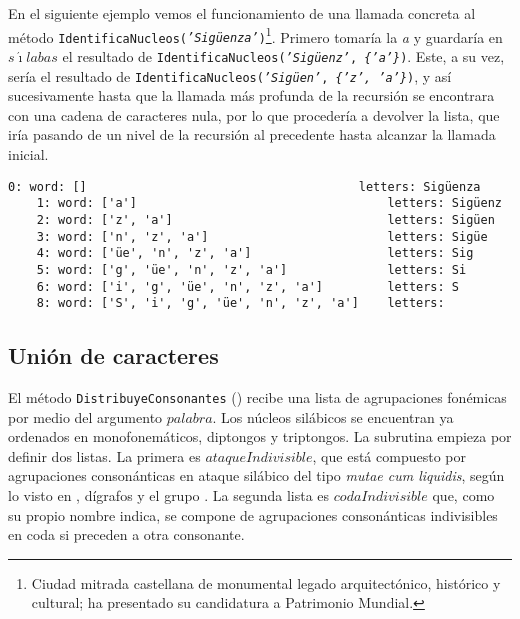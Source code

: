 En el siguiente ejemplo vemos el funcionamiento de una llamada concreta al método \texttt{IdentificaNucleos(\textit{'Sigüenza'})}\footnote{Ciudad mitrada castellana de monumental legado arquitectónico, histórico y cultural; ha presentado su candidatura a Patrimonio Mundial.}. Primero tomaría la \textit{a} y guardaría en  $s\acute{\imath}labas$ el resultado de \texttt{IdentificaNucleos(\textit{'Sigüenz'}, \textit{\{'a'\}})}. Este, a su vez, sería el resultado de \texttt{IdentificaNucleos(\textit{'Sigüen'}, \textit{\{'z', 'a'\}})}, y así sucesivamente hasta que la llamada más profunda de la recursión se encontrara con una cadena de caracteres nula, por lo que procedería a devolver la lista, que iría pasando de un nivel de la recursión al precedente hasta alcanzar la llamada inicial.
 
\begin{Verbatim}[fontsize=\footnotesize,xleftmargin=5ex]
	0: word: []                                      letters: Sigüenza
	1: word: ['a']                                   letters: Sigüenz
	2: word: ['z', 'a']                              letters: Sigüen
	3: word: ['n', 'z', 'a']                         letters: Sigüe
	4: word: ['üe', 'n', 'z', 'a']                   letters: Sig
	5: word: ['g', 'üe', 'n', 'z', 'a']              letters: Si
	6: word: ['i', 'g', 'üe', 'n', 'z', 'a']         letters: S
	8: word: ['S', 'i', 'g', 'üe', 'n', 'z', 'a']    letters:
\end{Verbatim}

\subsection{Unión de caracteres}
El método \texttt{DistribuyeConsonantes}  () recibe una lista de agrupaciones fonémicas por medio del argumento  $palabra$. Los núcleos silábicos se encuentran ya ordenados en monofonemáticos, diptongos y triptongos. La subrutina empieza por definir dos listas. La primera es $ataqueIndivisible$, que está compuesto por agrupaciones consonánticas en ataque silábico del tipo \textit{mutae cum liquidis}, según lo visto en , dígrafos y el grupo .  La segunda lista es $codaIndivisible$ que, como su propio nombre indica, se compone de agrupaciones consonánticas indivisibles en coda si preceden a otra consonante.

